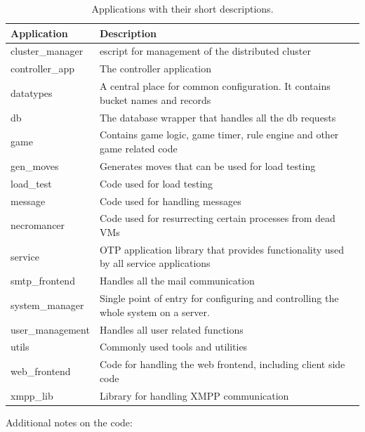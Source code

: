 \documentclass[11pt,a4paper]{report}
\begin{document}
\begin{center}
    \begin{table}[h]
    \centering
    \begin{tabular}{ | l |p{10cm}|}
    \hline
    \textbf{Application} & \textbf{Description} \\ \hline \hline
    cluster\_manager & escript for management of the distributed
    cluster \\ \hline
    controller\_app & The controller application \\ \hline
    datatypes & A central place for common configuration. It contains bucket
    names and records \\ \hline
    db & The database wrapper that handles all the db requests\\ \hline
    game & Contains game logic, game timer, rule engine and other game
    related code \\ \hline
    gen\_moves & Generates moves that can be used for load testing \\ \hline
    load\_test & Code used for load testing \\ \hline
    message & Code used for handling messages \\ \hline
    necromancer & Code used for resurrecting certain processes from dead VMs \\ \hline
    service &  OTP application library that provides functionality used by
    all service applications \\ \hline
    smtp\_frontend & Handles all the mail communication \\ \hline
    system\_manager & Single point of entry for configuring and controlling
    the whole system on a server. \\ \hline
    user\_management & Handles all user related functions \\ \hline
    utils & Commonly used tools and utilities \\ \hline
    web\_frontend & Code for handling the web frontend, including client
    side code \\ \hline
    xmpp\_lib & Library for handling XMPP communication \\ \hline
    \end{tabular}
    \caption{Applications with their short descriptions.}
    \label{table1}
    \end{table}
\end{center}


Additional notes on the code:
\end{document}

